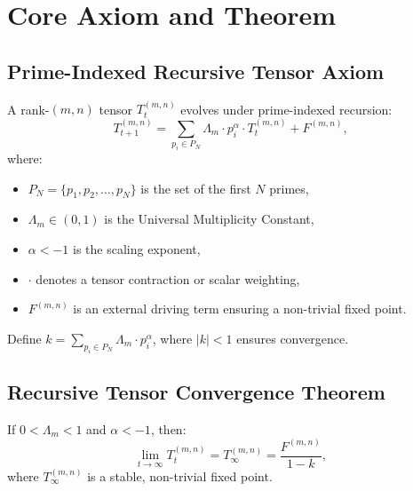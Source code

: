 \documentclass{article}
\theoremstyle{plain}
\begin{document}
\section{Core Axiom and Theorem}
\subsection{Prime-Indexed Recursive Tensor Axiom}
A rank-$(m,n)$ tensor \( T_t^{(m,n)} \) evolves under prime-indexed recursion:
\begin{equation}
T_{t+1}^{(m,n)} = \sum_{p_i \in P_N} \Lambda_m \cdot p_i^\alpha \cdot T_t^{(m,n)} + F^{(m,n)},
\label{eq:pirtm_axiom}
\end{equation}
where:
\begin{itemize}
    \item \( P_N = \{p_1, p_2, \dots, p_N\} \) is the set of the first \( N \) primes,
    \item \( \Lambda_m \in (0, 1) \) is the Universal Multiplicity Constant,
    \item \( \alpha < -1 \) is the scaling exponent,
    \item \( \cdot \) denotes a tensor contraction or scalar weighting,
    \item \( F^{(m,n)} \) is an external driving term ensuring a non-trivial fixed point.
\end{itemize}
Define \( k = \sum_{p_i \in P_N} \Lambda_m \cdot p_i^\alpha \), where \( |k| < 1 \) ensures convergence.

\subsection{Recursive Tensor Convergence Theorem}
If \( 0 < \Lambda_m < 1 \) and \( \alpha < -1 \), then:
\begin{equation}
\lim_{t \to \infty} T_t^{(m,n)} = T_\infty^{(m,n)} = \frac{F^{(m,n)}}{1 - k},
\label{eq:pirtm_theorem}
\end{equation}
where \( T_\infty^{(m,n)} \) is a stable, non-trivial fixed point.
\end{document}
